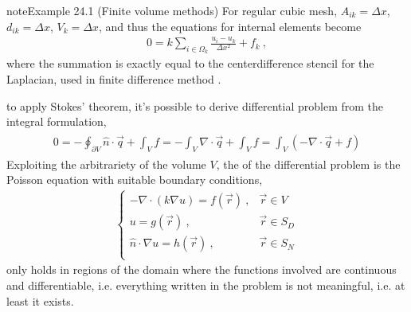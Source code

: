 \documentclass[letterpaper,10pt,english]{jupyterBook}
\begin{document}
\begin{sphinxadmonition}{note}{Example 24.1 (Finite volume methods)}
\sphinxAtStartPar
For regular cubic mesh, \(A_{ik} = \Delta x\), \(d_{ik} = \Delta x\), \(V_k = \Delta x\), and thus the equations for internal elements become
\begin{equation*}
\begin{split}0 = k \sum_{i \in \Omega_k} \frac{u_i - u_k}{\Delta x^2} + f_k \ ,\end{split}
\end{equation*}
\sphinxAtStartPar
where the summation is exactly equal to the center\sphinxhyphen{}difference stencil for the Laplacian, used in finite difference method {\hyperref[\detokenize{ch/pde/numerics:pde:ex:fdm}]{}}.
\end{sphinxadmonition}

\sphinxAtStartPar
{} to apply Stokes’ theorem, it’s possible to derive differential problem from the integral formulation,
\begin{equation*}
\begin{split}\begin{aligned}
  0 
    = - \oint_{\partial V} \hat{n} \cdot \vec{q} + \int_{V} f 
    = - \int_{V} \nabla \cdot \vec{q} + \int_{V} f = \int_{V} \left( - \nabla \cdot \vec{q} + f  \right)
\end{aligned}\end{split}
\end{equation*}
\sphinxAtStartPar
Exploiting the arbitrariety of the volume \(V\), the  of the differential problem is the Poisson equation with suitable boundary conditions,
\begin{equation*}
\begin{split}\begin{cases}
  - \nabla \cdot \left( k \nabla u \right) = f(\vec{r}) \ , & \vec{r} \in V \\
  u = g(\vec{r})                                        \ , & \vec{r} \in S_{D} \\
  \hat{n} \cdot \nabla u = h(\vec{r})                   \ , & \vec{r} \in S_{N}  \\
\end{cases}\end{split}
\end{equation*}
\sphinxAtStartPar
only holds in regions of the domain where the functions involved are continuous and differentiable, i.e. everything written in the problem is not meaningful, i.e. at least it exists.
\label{ch/pde/numerics:pde:ex:fdm}
\end{document}
